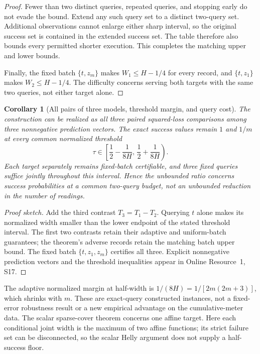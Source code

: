 \documentclass[12pt]{article}
\newtheorem{corollary}{Corollary}
\begin{document}
\begin{proof}
Fewer than two distinct queries, repeated queries, and stopping early do
not evade the bound. Extend any such query set to a distinct two-query
set. Additional observations cannot enlarge either sharp interval, so the
original success set is contained in the extended success set. The table
therefore also bounds every permitted shorter execution. This completes
the matching upper and lower bounds.

Finally, the fixed batch $\{t,z_m\}$ makes $W_1\leq H-1/4$ for every
record, and $\{t,z_1\}$ makes $W_2\leq H-1/4$. The difficulty concerns
serving both targets with the same two queries, not either target alone.
\end{proof}

\begin{corollary}[All pairs of three models, threshold margin, and query cost]
\label{cor:all-pairs-collapse}
The construction can be realized as all three paired squared-loss
comparisons among three nonnegative prediction vectors. The exact success
values remain $1$ and $1/m$ at every common normalized threshold
\[
 \tau\in\left[\frac12-\frac1{8H},\,
                    \frac12+\frac1{8H}\right).
\]
Each target separately remains fixed-batch certifiable, and three fixed
queries suffice jointly throughout this interval. Hence the unbounded
ratio concerns success probabilities at a common two-query budget, not
an unbounded reduction in the number of readings.
\end{corollary}

\begin{proof}[Proof sketch]
Add the third contrast $T_3=T_1-T_2$. Querying $t$ alone makes its normalized
width smaller than the lower endpoint of the stated threshold interval.
The first two contrasts retain their adaptive and uniform-batch guarantees;
the theorem's adverse records retain the matching batch upper bound.
The fixed batch $\{t,z_1,z_m\}$ certifies all three. Explicit nonnegative
prediction vectors and the threshold inequalities appear in Online
Resource~1, S17.
\end{proof}


The adaptive normalized margin at half-width is
$1/(8H)=1/[2m(2m+3)]$, which shrinks with $m$. These are exact-query
constructed instances, not a fixed-error robustness result or a new
empirical advantage on the cumulative-meter data. The scalar sparse-cover
theorem concerns one affine target. Here each conditional joint width is
the maximum of two affine functions; its strict failure set can be
disconnected, so the scalar Helly argument does not supply a half-success
floor.
\end{document}
